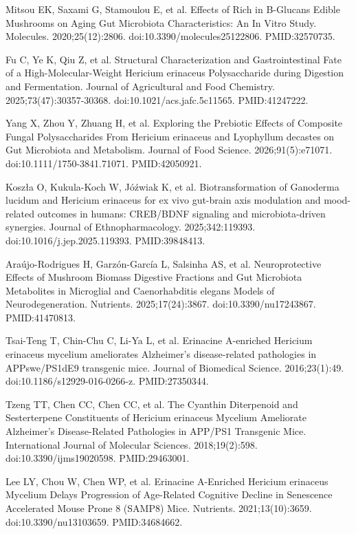 \documentclass[12pt,oneside]{book}
\newcommand{\reff}[2]{\par\hangindent=7mm\hangafter=1\noindent[#1]\hspace{2mm}#2\par}
\begin{document}
\reff{21}{Mitsou EK, Saxami G, Stamoulou E, et al. Effects of Rich in Β-Glucans Edible Mushrooms on Aging Gut Microbiota Characteristics: An In Vitro Study. Molecules. 2020;25(12):2806. doi:10.3390/molecules25122806. PMID:32570735.}

\reff{22}{Fu C, Ye K, Qiu Z, et al. Structural Characterization and Gastrointestinal Fate of a High-Molecular-Weight Hericium erinaceus Polysaccharide during Digestion and Fermentation. Journal of Agricultural and Food Chemistry. 2025;73(47):30357-30368. doi:10.1021/acs.jafc.5c11565. PMID:41247222.}

\reff{23}{Yang X, Zhou Y, Zhuang H, et al. Exploring the Prebiotic Effects of Composite Fungal Polysaccharides From Hericium erinaceus and Lyophyllum decastes on Gut Microbiota and Metabolism. Journal of Food Science. 2026;91(5):e71071. doi:10.1111/1750-3841.71071. PMID:42050921.}

\reff{24}{Koszła O, Kukula-Koch W, Jóźwiak K, et al. Biotransformation of Ganoderma lucidum and Hericium erinaceus for ex vivo gut-brain axis modulation and mood-related outcomes in humans: CREB/BDNF signaling and microbiota-driven synergies. Journal of Ethnopharmacology. 2025;342:119393. doi:10.1016/j.jep.2025.119393. PMID:39848413.}

\reff{25}{Araújo-Rodrigues H, Garzón-García L, Salsinha AS, et al. Neuroprotective Effects of Mushroom Biomass Digestive Fractions and Gut Microbiota Metabolites in Microglial and Caenorhabditis elegans Models of Neurodegeneration. Nutrients. 2025;17(24):3867. doi:10.3390/nu17243867. PMID:41470813.}

\reff{26}{Tsai-Teng T, Chin-Chu C, Li-Ya L, et al. Erinacine A-enriched Hericium erinaceus mycelium ameliorates Alzheimer's disease-related pathologies in APPswe/PS1dE9 transgenic mice. Journal of Biomedical Science. 2016;23(1):49. doi:10.1186/s12929-016-0266-z. PMID:27350344.}

\reff{27}{Tzeng TT, Chen CC, Chen CC, et al. The Cyanthin Diterpenoid and Sesterterpene Constituents of Hericium erinaceus Mycelium Ameliorate Alzheimer's Disease-Related Pathologies in APP/PS1 Transgenic Mice. International Journal of Molecular Sciences. 2018;19(2):598. doi:10.3390/ijms19020598. PMID:29463001.}

\reff{28}{Lee LY, Chou W, Chen WP, et al. Erinacine A-Enriched Hericium erinaceus Mycelium Delays Progression of Age-Related Cognitive Decline in Senescence Accelerated Mouse Prone 8 (SAMP8) Mice. Nutrients. 2021;13(10):3659. doi:10.3390/nu13103659. PMID:34684662.}
\end{document}
